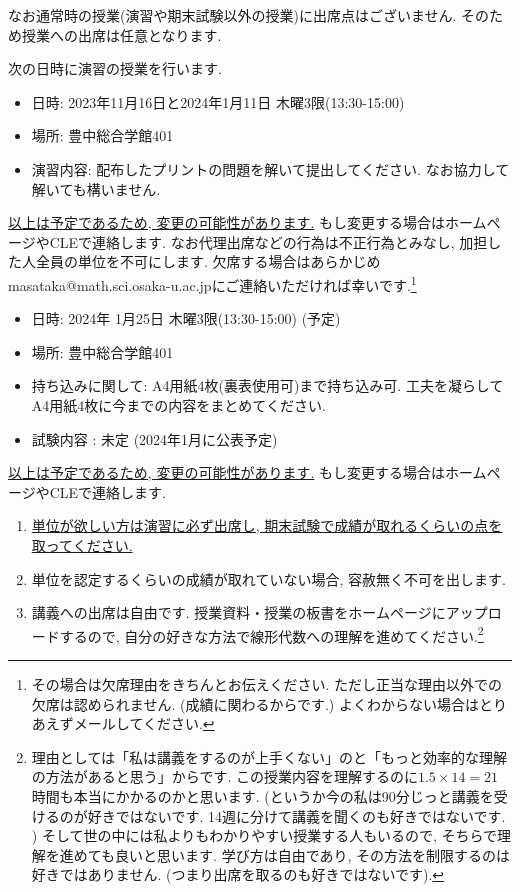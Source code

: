 \documentclass[dvipdfmx,a4paper,11pt]{article}
\theoremstyle{definition}
\begin{document}
なお通常時の授業(演習や期末試験以外の授業)に出席点はございません. そのため授業への出席は任意となります. 


\medskip
{}

次の日時に演習の授業を行います. 
\begin{itemize}
  \setlength{\parskip}{0cm} 
  \setlength{\itemsep}{0cm}
\item 日時: 2023年11月16日と2024年1月11日 木曜3限(13:30-15:00)
\item 場所: 豊中総合学館401
\item 演習内容: 配布したプリントの問題を解いて提出してください. なお協力して解いても構いません. 
\end{itemize}
\underline{以上は予定であるため, 変更の可能性があります.} もし変更する場合はホームページやCLEで連絡します. 
なお代理出席などの行為は不正行為とみなし, 加担した人全員の単位を不可にします.
欠席する場合はあらかじめmasataka@math.sci.osaka-u.ac.jpにご連絡いただければ幸いです.\footnote{その場合は欠席理由をきちんとお伝えください. ただし正当な理由以外での欠席は認められません. (成績に関わるからです.) よくわからない場合はとりあえずメールしてください.}

\newpage
{}


\begin{itemize}
  \setlength{\parskip}{0cm} 
  \setlength{\itemsep}{0cm}
\item 日時: 2024年 1月25日 木曜3限(13:30-15:00) (予定)
\item 場所: 豊中総合学館401
\item 持ち込みに関して: A4用紙4枚(裏表使用可)まで持ち込み可. 工夫を凝らしてA4用紙4枚に今までの内容をまとめてください.
\item 試験内容 : 未定 (2024年1月に公表予定)
\end{itemize}
\underline{以上は予定であるため, 変更の可能性があります.} もし変更する場合はホームページやCLEで連絡します. 

\medskip
{}
\begin{enumerate}
  \setlength{\parskip}{0cm} 
  \setlength{\itemsep}{0cm} 
\item \underline{単位が欲しい方は演習に必ず出席し, 期末試験で成績が取れるくらいの点を取ってください.} 
\item 単位を認定するくらいの成績が取れていない場合, 容赦無く不可を出します. 
\item 講義への出席は自由です. 授業資料・授業の板書をホームページにアップロードするので, 自分の好きな方法で線形代数への理解を進めてください.\footnote{理由としては「私は講義をするのが上手くない」のと「もっと効率的な理解の方法があると思う」からです. この授業内容を理解するのに$1.5 \times 14 = 21$時間も本当にかかるのかと思います. (というか今の私は90分じっと講義を受けるのが好きではないです.  14週に分けて講義を聞くのも好きではないです. ) そして世の中には私よりもわかりやすい授業する人もいるので, そちらで理解を進めても良いと思います. 学び方は自由であり, その方法を制限するのは好きではありません. (つまり出席を取るのも好きではないです).}
\end{enumerate}
\end{document}
